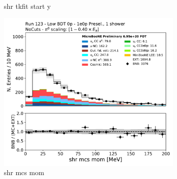 \begin{figure}[H]
\begin{subfigure}{0.3\textwidth}
    \caption{shr tkfit start y}
    \end{subfigure}
    \begin{subfigure}{0.3\textwidth}
    \includegraphics[width=1.0\textwidth]{1e0p/Low_BDT_Sideband/shrMCSMom.pdf}
    \caption{shr mcs mom}
    \end{subfigure}
    \caption{} 
    \label{fig:HE_1eNp_1}
\end{figure}

